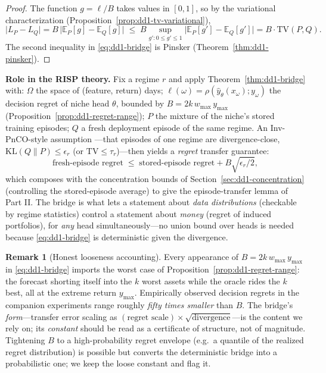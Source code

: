 \documentclass[11pt,a4paper]{article}
\theoremstyle{definition}
\newtheorem{remark}{Remark}[section]
\theoremstyle{plain}
\newcommand{\E}{\mathbb{E}}
\newcommand{\KL}{\mathrm{KL}}
\newcommand{\TV}{\mathrm{TV}}
\newcommand{\nm}{\textsc{RISP}}
\begin{document}
\begin{proof}
The function $g = \ell / B$ takes values in $[0, 1]$, so by the variational
characterization (Proposition~\ref{prop:dd1-tv-variational}),
\[
\bigl| L_P - L_Q \bigr| = B \,\bigl| \E_P[g] - \E_Q[g] \bigr|
\;\le\; B \sup_{g' : 0 \le g' \le 1} \bigl| \E_P[g'] - \E_Q[g'] \bigr|
= B \cdot \TV(P, Q).
\]
The second inequality in \eqref{eq:dd1-bridge} is Pinsker
(Theorem~\ref{thm:dd1-pinsker}).
\end{proof}

\begin{keypoint}
\textbf{Role in the \nm{} theory.} Fix a regime $r$ and apply
Theorem~\ref{thm:dd1-bridge} with: $\Omega$ the space of (feature, return)
days; $\ell(\omega) = \rho(\hat{y}_\theta(x_\omega); y_\omega)$ the decision
regret of niche head $\theta$, bounded by $B = 2 k\, w_{\max}\, y_{\max}$
(Proposition~\ref{prop:dd1-regret-range}); $P$ the mixture of the niche's
stored training episodes; $Q$ a fresh deployment episode of the same regime.
An Inv-PnCO-style assumption \cite{yan2026invpnco}---that episodes of one
regime are divergence-close, $\KL(Q \| P) \le \epsilon_r$ (or
$\TV \le \tau_r$)---then yields a \emph{regret} transfer guarantee:
\[
\text{fresh-episode regret}
\;\le\; \text{stored-episode regret} + B\sqrt{\epsilon_r / 2},
\]
which composes with the concentration bounds of
Section~\ref{sec:dd1-concentration} (controlling the stored-episode average)
to give the episode-transfer lemma of Part II. The bridge is what lets a
statement about \emph{data distributions} (checkable by regime statistics)
control a statement about \emph{money} (regret of induced portfolios), for
\emph{any} head simultaneously---no union bound over heads is needed because
\eqref{eq:dd1-bridge} is deterministic given the divergence.
\end{keypoint}

\begin{remark}[Honest looseness accounting]
\label{rem:dd1-B-loose}
Every appearance of $B = 2 k\, w_{\max}\, y_{\max}$ in
\eqref{eq:dd1-bridge} imports the worst case of
Proposition~\ref{prop:dd1-regret-range}: the forecast shorting itself into
the $k$ worst assets while the oracle rides the $k$ best, all at the extreme
return $y_{\max}$. Empirically observed decision regrets in the companion
experiments range roughly \emph{fifty times smaller} than $B$. The bridge's
\emph{form}---transfer error scaling as
$(\text{regret scale}) \times \sqrt{\text{divergence}}$---is the content we
rely on; its \emph{constant} should be read as a certificate of structure,
not of magnitude. Tightening $B$ to a high-probability regret envelope (e.g.\
a quantile of the realized regret distribution) is possible but converts the
deterministic bridge into a probabilistic one; we keep the loose constant and
flag it.
\end{remark}
\end{document}
